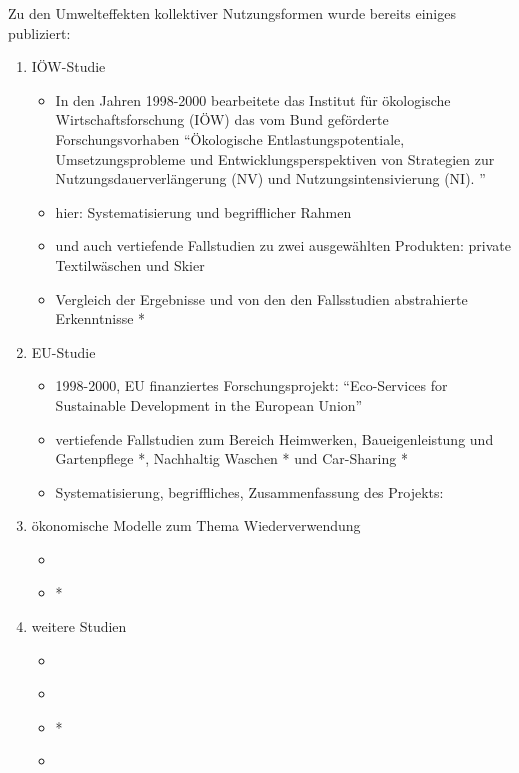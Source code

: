 \documentclass[11pt, titlepage=true]{scrartcl} %
\begin{document}
Zu den Umwelteffekten kollektiver Nutzungsformen wurde bereits einiges
publiziert: 
\begin{enumerate}
     \item IÖW-Studie
       \begin{itemize}
         \item In den Jahren 1998-2000 bearbeitete das Institut für ökologische
           Wirtschaftsforschung (IÖW) das vom Bund geförderte
           Forschungsvorhaben \enquote{Ökologische Entlastungspotentiale,
             Umsetzungsprobleme und Entwicklungsperspektiven von Strategien zur
             Nutzungsdauerverlängerung (NV) und Nutzungsintensivierung (NI). }

         \item  hier: Systematisierung und begrifflicher Rahmen
           \cite{scholl_produkte_1998}

         \item  und auch vertiefende Fallstudien zu zwei ausgewählten Produkten:
           private Textilwäschen \cite{hirschl_produkte_2000} und Skier
           \cite{konrad_produkte_2000}

         \item  Vergleich der Ergebnisse und von den den Fallsstudien
           abstrahierte Erkenntnisse \cite{hirschl_nachhaltige_2001}*
       \end{itemize}

     \item EU-Studie
       \begin{itemize}
         \item 1998-2000, EU finanziertes Forschungsprojekt:
           \enquote{Eco-Services for Sustainable Development in the European
           Union}
         \item vertiefende Fallstudien zum Bereich Heimwerken, Baueigenleistung
           und Gartenpflege \cite{behrendt_oko-rent_2000}*, Nachhaltig
           Waschen \cite{behrendt_nachhaltig_2000}* und
           Car-Sharing \cite{behrendt_car-sharing_2000}*
         \item Systematisierung, begriffliches, Zusammenfassung des Projekts:
           \cite{behrendt_eco-service_2003}
       \end{itemize}
     \item ökonomische Modelle zum Thema Wiederverwendung
       \begin{itemize}
         \item \cite{yokoo_economic_2010}
         \item \cite{thomas_environmental_2011}*
       \end{itemize}
     \item weitere Studien
       \begin{itemize}
         \item \cite{rabelt_nachhaltiger_2007}
         \item \cite{scholl_marketing_2009}
         \item \cite{erdmann_quantifizierung_2011}*
         \item \cite{scholl_nutzen_2012}
       \end{itemize}
\end{enumerate}
\end{document}
